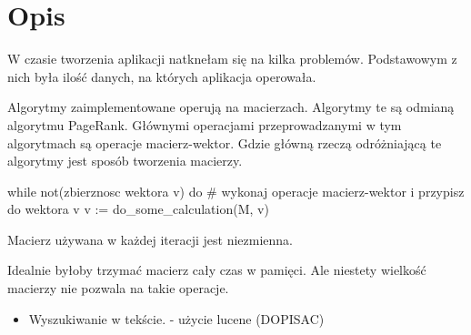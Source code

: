 \documentclass[11pt,a4paper]{report}
\begin{document}
\tableofcontents
\chapter{Opis}

W czasie tworzenia aplikacji natknełam się na kilka problemów. Podstawowym z nich była ilość danych, na których aplikacja operowała. 

Algorytmy zaimplementowane operują na macierzach. Algorytmy te są odmianą algorytmu PageRank. Głównymi operacjami przeprowadzanymi w tym algorytmach są operacje macierz-wektor. Gdzie główną rzeczą odróżniającą te algorytmy jest sposób tworzenia macierzy. 

while not(zbierznosc wektora v) do
	\# wykonaj operacje macierz-wektor i przypisz do wektora v
	v := do\_some\_calculation(M, v)

Macierz używana w każdej iteracji jest niezmienna.

Idealnie byłoby trzymać macierz cały czas w pamięci. Ale niestety wielkość macierzy nie pozwala na takie operacje. 


\begin{itemize}
\item Wyszukiwanie w tekście. - użycie lucene (DOPISAC)

\end{itemize}
\end{document}
